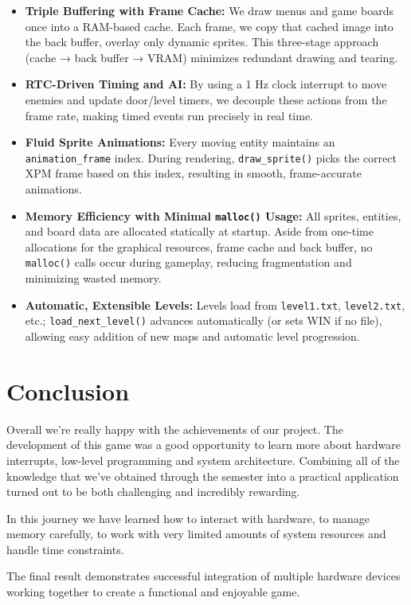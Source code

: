 \documentclass[12pt,a4paper]{article}
\begin{document}
\begin{itemize}
  \item \textbf{Triple Buffering with Frame Cache:}
    We draw menus and game boards once into a RAM-based cache. Each frame, we copy that cached image into the back buffer, overlay only dynamic sprites. This three-stage approach (cache → back buffer → VRAM) minimizes redundant drawing and tearing.

  \item \textbf{RTC-Driven Timing and AI:}
    By using a 1 Hz clock interrupt to move enemies and update door/level timers, we decouple these actions from the frame rate, making timed events run precisely in real time.

  \item \textbf{Fluid Sprite Animations:}
    Every moving entity maintains an \texttt{animation\_frame} index. During rendering, \texttt{draw\_sprite()} picks the correct XPM frame based on this index, resulting in smooth, frame-accurate animations.

  \item \textbf{Memory Efficiency with Minimal \texttt{malloc()} Usage:}
    All sprites, entities, and board data are allocated statically at startup. Aside from one-time allocations for the graphical resources, frame cache and back buffer, no \texttt{malloc()} calls occur during gameplay, reducing fragmentation and minimizing wasted memory.

  \item \textbf{Automatic, Extensible Levels:}
    Levels load from \texttt{level1.txt}, \texttt{level2.txt}, etc.; \texttt{load\_next\_level()} advances automatically (or sets WIN if no file), allowing easy addition of new maps and automatic level progression.
\end{itemize}


\section{Conclusion}

Overall we're really happy with the achievements of our project. The development of this game was a good opportunity to learn more about hardware interrupts, low-level programming and system architecture. Combining all of the knowledge that we've obtained through the semester into a practical application turned out to be both challenging and incredibly rewarding.

In this journey we have learned how to interact with hardware, to manage memory carefully, to work with very limited amounts of system resources and handle time constraints.

The final result demonstrates successful integration of multiple hardware devices working together to create a functional and enjoyable game.
\end{document}
